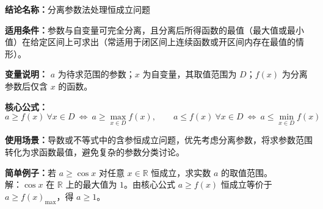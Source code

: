 \textbf{结论名称：}分离参数法处理恒成立问题

\textbf{适用条件：}参数与自变量可完全分离，且分离后所得函数的最值（最大值或最小值）在给定区间上可求出（常适用于闭区间上连续函数或开区间内存在最值的情形）。

\textbf{变量说明：} $a$ 为待求范围的参数；$x$ 为自变量，其取值范围为 $D$；$f(x)$ 为分离参数后仅含 $x$ 的函数。

\textbf{核心公式：}
\[
\boxed{a \ge f(x)\ \forall x\in D \ \Longleftrightarrow\ a \ge \max_{x\in D} f(x)},\qquad
\boxed{a \le f(x)\ \forall x\in D \ \Longleftrightarrow\ a \le \min_{x\in D} f(x)}
\]

\textbf{使用场景：}导数或不等式中的含参恒成立问题，优先考虑分离参数，将求参数范围转化为求函数最值，避免复杂的参数分类讨论。

\textbf{简单例子：}若 $a \ge \cos x$ 对任意 $x\in\mathbb{R}$ 恒成立，求实数 $a$ 的取值范围。\\
解：$\cos x$ 在 $\mathbb{R}$ 上的最大值为 $1$。由核心公式 $a\ge f(x)$ 恒成立等价于 $a\ge f(x)_{\max}$，得 $a\ge 1$。
